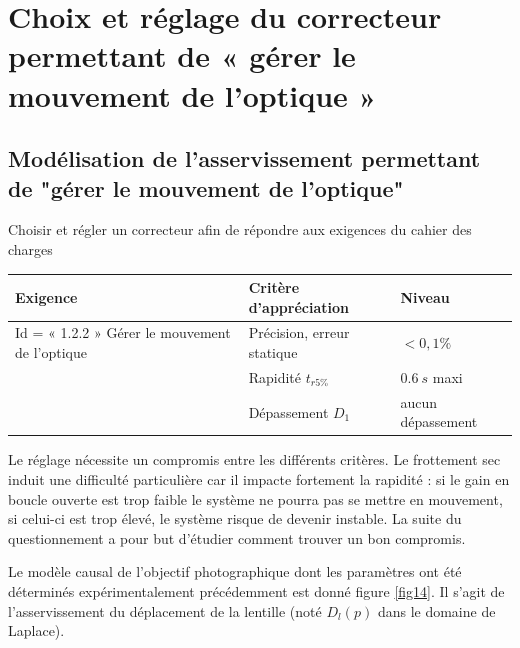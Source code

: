 \ifprof
\begin{corrige}
\end{corrige}
\else
\fi


\ifprof
\begin{corrige}
\end{corrige}
\else
\fi


\section{Choix et réglage du correcteur permettant de « gérer le mouvement
de l’optique »}
\subsection{Modélisation de l'asservissement permettant de "gérer le mouvement de l'optique"}

\begin{obj}
Choisir et régler un correcteur afin de répondre aux exigences du cahier des charges
\end{obj}

\begin{center}
\begin{tabular}{|p{}|p{}|p{}|}
\hline 
\textbf{Exigence} & \textbf{Critère d'appréciation} & \textbf{Niveau} \\ 
\hline 
Id = « 1.2.2 » Gérer le mouvement de l'optique & Précision, erreur statique & $<0,1\%$ \\ 
\cline{2-3}
& Rapidité $t_{r5\%}$ & $\SI{0,6}{s}$ maxi \\ 
\cline{2-3}
& Dépassement $D_1$ & aucun dépassement \\ 
\hline 
\end{tabular} 
\end{center}


Le réglage nécessite un compromis
entre les différents critères. Le frottement sec induit une difficulté
particulière car il impacte fortement la rapidité : si le gain en boucle
ouverte est trop faible le système ne pourra pas se mettre en mouvement,
si celui-ci est trop élevé, le système risque de devenir instable. La
suite du questionnement a pour but d'étudier comment trouver un bon
compromis.

Le modèle causal de l'objectif photographique dont les paramètres ont
été déterminés expérimentalement précédemment est donné figure \ref{fig14}. Il s'agit de l'asservissement du déplacement de la lentille (noté $D_l(p)$ dans le domaine de Laplace).

